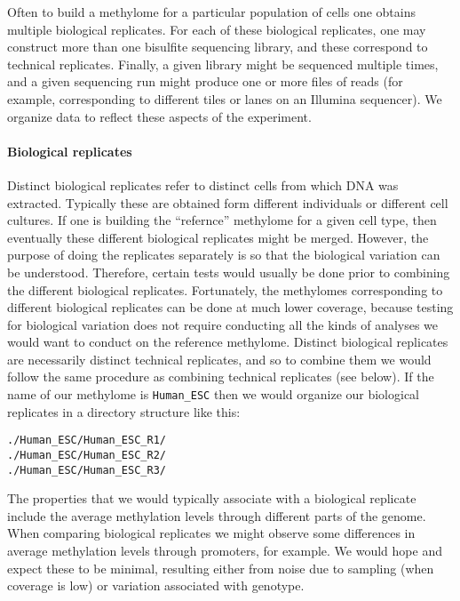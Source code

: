 \documentclass[10pt]{article}
\begin{document}
{{Often to build a methylome for a particular population of cells one
obtains multiple biological replicates. For each of these biological
replicates, one may construct more than one bisulfite sequencing
library, and these correspond to technical replicates. Finally, a
given library might be sequenced multiple times, and a given
sequencing run might produce one or more files of reads (for example,
corresponding to different tiles or lanes on an Illumina
sequencer). We organize data to reflect these aspects of the experiment.

\paragraph{Biological replicates}
Distinct biological replicates refer to distinct cells from which DNA
was extracted. Typically these are obtained form different individuals
or different cell cultures. If one is building the ``refernce''
methylome for a given cell type, then eventually these different
biological replicates might be merged. However, the purpose of doing
the replicates separately is so that the biological variation can be
understood. Therefore, certain tests would usually be done prior to
combining the different biological replicates. Fortunately, the
methylomes corresponding to different biological replicates can be
done at much lower coverage, because testing for biological variation
does not require conducting all the kinds of analyses we would want to
conduct on the reference methylome. Distinct biological replicates are
necessarily distinct technical replicates, and so to combine them we
would follow the same procedure as combining technical replicates (see
below). If the name of our methylome is \texttt{Human\_ESC} then we
would organize our biological replicates in a directory structure like
this:
\begin{verbatim}
./Human_ESC/Human_ESC_R1/
./Human_ESC/Human_ESC_R2/
./Human_ESC/Human_ESC_R3/
\end{verbatim}
The properties that we would typically associate with a biological
replicate include the average methylation levels through different
parts of the genome. When comparing biological replicates we might
observe some differences in average methylation levels through
promoters, for example. We would hope and expect these to be minimal,
resulting either from noise due to sampling (when coverage is low) or
variation associated with genotype.

}}
\end{document}
